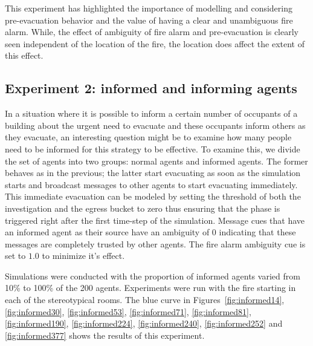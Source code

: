 This experiment has highlighted the importance of modelling and considering pre-evacuation behavior and the value of having a clear and unambiguous fire alarm. While, the effect of ambiguity of fire alarm and pre-evacuation is clearly seen independent of the location of the fire, the location does affect the extent of this effect.




\subsection{Experiment 2: informed and informing agents} %
\label{sec:experiment_2_informed_and_informing_agents}

In a situation where it is possible to inform a certain number of occupants of a building about the urgent need to evacuate and these occupants inform others as they evacuate, an interesting question might be to examine how many people need to be informed for this strategy to be effective. To examine this, we divide the set of agents into two groups:  normal agents and informed agents. The former behaves as in the previous; the latter start evacuating as soon as the simulation starts and broadcast messages to other agents to start evacuating immediately. This immediate evacuation can be modeled by setting the threshold of both the investigation and the egress bucket to zero thus ensuring that the phase is triggered right after the first time-step of the simulation. Message cues that have an informed agent as their source have an ambiguity of 0 indicating that these messages are completely trusted by other agents. The fire alarm ambiguity cue is set to $1.0$ to minimize it's effect.

Simulations were conducted with the proportion of informed agents varied from 10\% to 100\% of the 200 agents. Experiments were run with the fire starting in each of the stereotypical rooms. The blue curve in Figures~\ref{fig:informed14}, \ref{fig:informed30}, \ref{fig:informed53}, \ref{fig:informed71}, \ref{fig:informed81}, \ref{fig:informed190}, \ref{fig:informed224}, \ref{fig:informed240}, \ref{fig:informed252} and \ref{fig:informed377} shows the results of this experiment.

